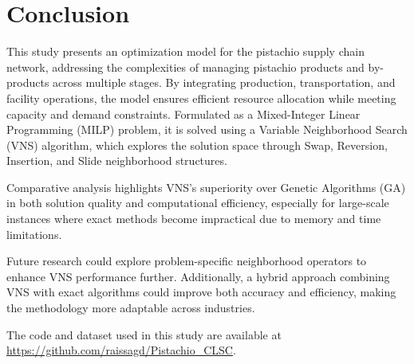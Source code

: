 \documentclass[a4paper]{ifacconf}
\begin{document}
\section{Conclusion}
\label{sec:conclusion}

This study presents an optimization model for the pistachio supply chain network, addressing the complexities of managing pistachio products 
and by-products across multiple stages. By integrating production, transportation, and facility operations, the model ensures efficient 
resource allocation while meeting capacity and demand constraints. Formulated as a Mixed-Integer Linear Programming (MILP) problem, it is 
solved using a Variable Neighborhood Search (VNS) algorithm, which explores the solution space through Swap, Reversion, Insertion, and 
Slide neighborhood structures.

Comparative analysis highlights VNS’s superiority over Genetic Algorithms (GA) in both solution quality and computational efficiency, 
especially for large-scale instances where exact methods become impractical due to memory and time limitations.

Future research could explore problem-specific neighborhood operators to enhance VNS performance further. Additionally, a hybrid approach 
combining VNS with exact algorithms could improve both accuracy and efficiency, making the methodology more adaptable across industries.

The code and dataset used in this study are available at \url{https://github.com/raissagd/Pistachio_CLSC}.

\fi

   
\end{document}
